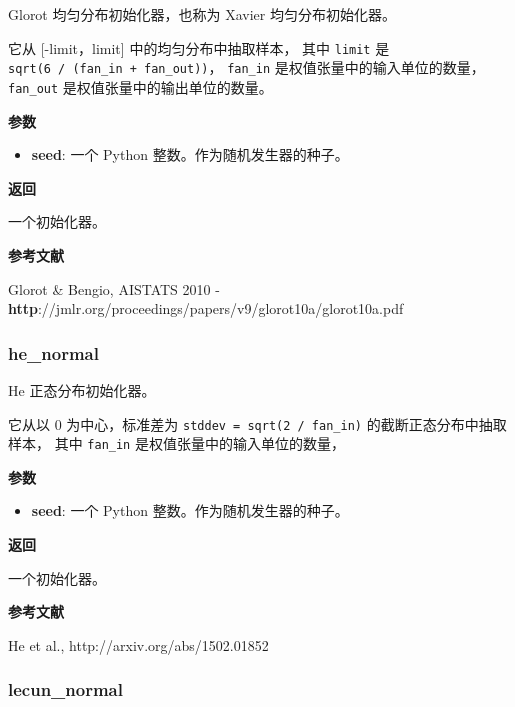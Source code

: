 Glorot 均匀分布初始化器，也称为 Xavier 均匀分布初始化器。

它从 {[}-limit，limit{]} 中的均匀分布中抽取样本， 其中 \texttt{limit} 是
\texttt{sqrt(6\ /\ (fan\_in\ +\ fan\_out))}， \texttt{fan\_in}
是权值张量中的输入单位的数量， \texttt{fan\_out}
是权值张量中的输出单位的数量。

\textbf{参数}

\begin{itemize}
\tightlist
\item
  \textbf{seed}: 一个 Python 整数。作为随机发生器的种子。
\end{itemize}

\textbf{返回}

一个初始化器。

\textbf{参考文献}

Glorot \& Bengio, AISTATS 2010 -
\textbf{http}://jmlr.org/proceedings/papers/v9/glorot10a/glorot10a.pdf



\subsubsection{he\_normal}\label{heux5fnormal}

\begin{Shaded}
\begin{Highlighting}[]
\OperatorTok{=}\NormalTok{)}
\end{Highlighting}
\end{Shaded}

He 正态分布初始化器。

它从以 0 为中心，标准差为 \texttt{stddev\ =\ sqrt(2\ /\ fan\_in)}
的截断正态分布中抽取样本， 其中 \texttt{fan\_in}
是权值张量中的输入单位的数量，

\textbf{参数}

\begin{itemize}
\tightlist
\item
  \textbf{seed}: 一个 Python 整数。作为随机发生器的种子。
\end{itemize}

\textbf{返回}

一个初始化器。

\textbf{参考文献}

He et al., http://arxiv.org/abs/1502.01852



\subsubsection{lecun\_normal}\label{lecunux5fnormal}

